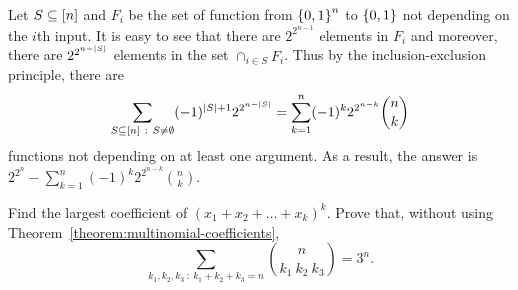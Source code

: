 \begin{chapterendexercises}
    \begin{solution}
      Let $S \subseteq {[{n}]}$ and $F_i$ be the set of function from $\set{0,
      1}^n$ to $\set{0, 1}$ not depending on the $i$th input. It is easy to see
      that there are $2^{2^{n - 1}}$ elements in $F_i$ and moreover, there are
      $2^{2^{n - \left|{S}\right|}}$ elements in the set $\cap_{i \in S} F_i$.
      Thus by the inclusion-exclusion principle, there are
      \[
        \sum_{S \subseteq [n] ~:~ S \neq \emptyset} 
          (-1)^{\left|{S}\right| + 1} 2^{2^{n - \left|{S}\right|}} =
        \sum_{k = 1}^n (-1)^k 2^{2^{n - k}} \binom{n}{k}
      \]
      functions not depending on at least one argument.
      As a result, the answer is $2^{2^n} -
      \sum_{k = 1}^n (-1)^k 2^{2^{n - k}} \binom{n}{k}$.
    \end{solution}
  \exercise Find the largest coefficient of $(x_1 + x_2 + \dots + x_k)^k$.
  \exercise Prove that,
    without using Theorem~\ref{theorem:multinomial-coefficients},
    \[
      \sum_{k_1, k_2, k_3 ~:~ k_1 + k_2 + k_3 = n} \binom{n}{k_1 \ k_2 \ k_3} =
      3^n.
    \]
\end{chapterendexercises}
